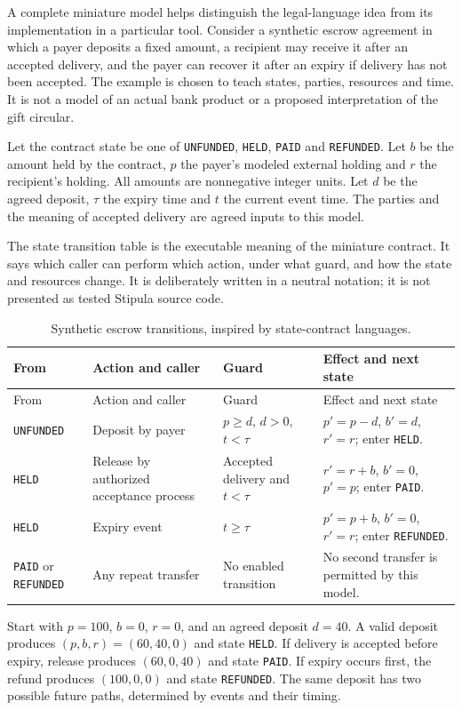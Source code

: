 \documentclass[12pt,a4paper,oneside,openany]{book}
\begin{document}
A complete miniature model helps distinguish the legal-language idea from its
implementation in a particular tool. Consider a synthetic escrow agreement in
which a payer deposits a fixed amount, a recipient may receive it after an
accepted delivery, and the payer can recover it after an expiry if delivery has
not been accepted. The example is chosen to teach states, parties, resources and
time. It is not a model of an actual bank product or a proposed interpretation of
the gift circular.

Let the contract state be one of \texttt{UNFUNDED}, \texttt{HELD},
\texttt{PAID} and \texttt{REFUNDED}. Let $b$ be the amount held by the contract,
$p$ the payer's modeled external holding and $r$ the recipient's holding. All
amounts are nonnegative integer units. Let $d$ be the agreed deposit, $\tau$ the
expiry time and $t$ the current event time. The parties and the meaning of
accepted delivery are agreed inputs to this model.

The state transition table is the executable meaning of the miniature contract.
It says which caller can perform which action, under what guard, and how the
state and resources change. It is deliberately written in a neutral notation;
it is not presented as tested Stipula source code.

\begin{longtable}{@{}P{24mm}P{33mm}P{42mm}P{48mm}@{}}
\caption{Synthetic escrow transitions, inspired by state-contract languages.}\\
\toprule
From & Action and caller & Guard & Effect and next state\\\midrule\endfirsthead
\toprule From & Action and caller & Guard & Effect and next state\\\midrule\endhead
\texttt{UNFUNDED} & Deposit by payer & $p\geq d$, $d>0$, $t<\tau$ & $p'=p-d$, $b'=d$, $r'=r$; enter \texttt{HELD}.\\
\texttt{HELD} & Release by authorized acceptance process & Accepted delivery and $t<\tau$ & $r'=r+b$, $b'=0$, $p'=p$; enter \texttt{PAID}.\\
\texttt{HELD} & Expiry event & $t\geq\tau$ & $p'=p+b$, $b'=0$, $r'=r$; enter \texttt{REFUNDED}.\\
\texttt{PAID} or \texttt{REFUNDED} & Any repeat transfer & No enabled transition & No second transfer is permitted by this model.\\
\bottomrule
\end{longtable}

Start with $p=100$, $b=0$, $r=0$, and an agreed deposit $d=40$. A valid deposit
produces $(p,b,r)=(60,40,0)$ and state \texttt{HELD}. If delivery is accepted before
expiry, release produces $(60,0,40)$ and state \texttt{PAID}. If expiry occurs
first, the refund produces $(100,0,0)$ and state \texttt{REFUNDED}. The same deposit
has two possible future paths, determined by events and their timing.
\end{document}
